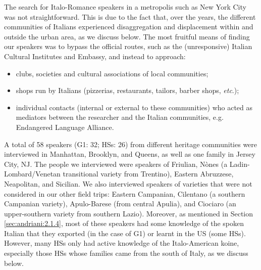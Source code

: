 \documentclass[output=paper,hidelinks]{langscibook}
\begin{document}
The search for Italo-Romance speakers in a metropolis such as New York City was not straightforward. This is due to the fact that, over the years, the different communities of Italians experienced disaggregation and displacement within and outside the urban area, as we discuss below. The most fruitful means of finding our speakers was to bypass the official routes, such as the (unresponsive) Italian Cultural Institutes and Embassy, and instead to approach:
\begin{itemize}
    \item clubs, societies and cultural associations of local communities;
    \item shops run by Italians (pizzerias, restaurants, tailors, barber shops, \textit{etc}.);
    \item individual contacts (internal or external to these communities) who acted as mediators between the researcher and the Italian communities, e.g. Endangered Language Alliance.
\end{itemize}
A total of 58 speakers (G1: 32; HSs: 26) from different heritage communities were interviewed in Manhattan, Brooklyn, and Queens, as well as one family in Jersey City, NJ. The people we interviewed were speakers of Friulian, Nònes (a Ladin-Lombard/Venetan transitional variety from Trentino), Eastern Abruzzese, Neapolitan, and Sicilian. We also interviewed speakers of varieties that were not considered in our other field trips: Eastern Campanian, Cilentano (a southern Campanian variety), Apulo-Barese (from central Apulia), and Ciociaro (an upper-southern variety from southern Lazio). Moreover, as mentioned in Section \ref{sec:andriani:2.1.4}, most of these speakers had some knowledge of the spoken Italian that they exported (in the case of G1) or learnt in the US (some HSs). However, many HSs only had active knowledge of the Italo-American koine, especially those HSs whose families came from the south of Italy, as we discuss below.
\end{document}
